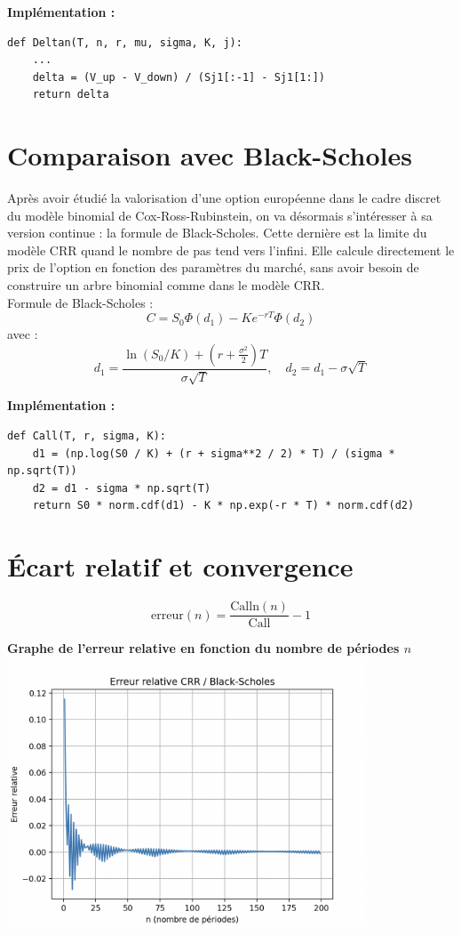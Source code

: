 \documentclass[a4paper,11pt]{article}
\begin{document}
\textbf{Implémentation :}
\begin{lstlisting}
def Deltan(T, n, r, mu, sigma, K, j):
    ...
    delta = (V_up - V_down) / (Sj1[:-1] - Sj1[1:])
    return delta
\end{lstlisting}

\section{Comparaison avec Black-Scholes}

Après avoir étudié la valorisation d’une option européenne dans le cadre discret du modèle binomial de Cox-Ross-Rubinstein, on va désormais s'intéresser à sa version continue : la formule de Black-Scholes. Cette dernière est la limite du modèle CRR quand le nombre de pas tend vers l’infini. Elle calcule directement le prix de l’option en fonction des paramètres du marché, sans avoir besoin de construire un arbre binomial comme dans le modèle CRR.\\

Formule de Black-Scholes :
\[
\boxed{C = S_0 \Phi(d_1) - K e^{-rT} \Phi(d_2)}
\]
avec :
\[
d_1 = \frac{\ln(S_0 / K) + (r + \frac{\sigma^2}{2})T}{\sigma \sqrt{T}}, \quad d_2 = d_1 - \sigma \sqrt{T}
\]

\textbf{Implémentation :}
\begin{lstlisting}
def Call(T, r, sigma, K):
    d1 = (np.log(S0 / K) + (r + sigma**2 / 2) * T) / (sigma * np.sqrt(T))
    d2 = d1 - sigma * np.sqrt(T)
    return S0 * norm.cdf(d1) - K * np.exp(-r * T) * norm.cdf(d2)
\end{lstlisting}

\section{Écart relatif et convergence}

\[
\boxed{\text{erreur}(n) = \frac{\text{Calln}(n)}{\text{Call}} - 1}
\]

\vspace{0.5cm}

\begin{center}
    \textbf{Graphe de l'erreur relative en fonction du nombre de périodes $n$}
    \includegraphics[width=0.8\textwidth]{error_plot.png}
\end{center}
\end{document}
